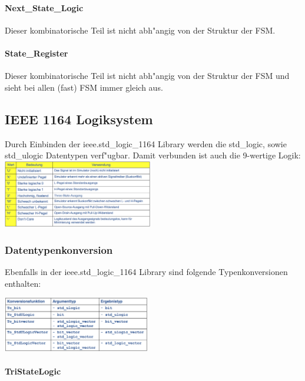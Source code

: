 			\begin{multicols}{2}
				\paragraph{Next\_State\_Logic} 
					Dieser kombinatorische Teil ist nicht abh"angig von der Struktur der 
					FSM.
					
				\paragraph{State\_Register}  
					Dieser kombinatorische Teil ist nicht abh"angig von der Struktur der 
					FSM und sieht bei allen (fast) FSM immer gleich aus.
					
					
					\vfill\null
					\columnbreak
					
					\subsection{IEEE 1164 Logiksystem}
			Durch Einbinden der ieee.std\_logic\_1164 Library werden die std\_logic, sowie 
			std\_ulogic Datentypen verf"ugbar. Damit verbunden ist auch die 9-wertige Logik:
				\includegraphics[width=0.49\textwidth]{pics/ieee1164logicsystem}
		\subsubsection{Datentypenkonversion}
			Ebenfalls in der ieee.std\_logic\_1164 Library sind folgende Typenkonversionen 
			enthalten:
			\begin{center}
				\includegraphics[width=0.48\textwidth]{pics/typeconversion}
			\end{center}
			
			\paragraph{TriStateLogic}
			
			\end{multicols}
	
